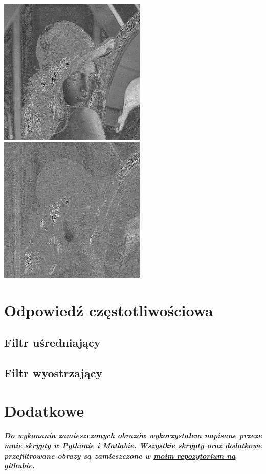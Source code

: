 \documentclass[a4paper,12pt,openany]{report}
\begin{document}
\begin{center}
\\
\\
\includegraphics[width=7cm]{resources/modified/lena/lena_sharpen_11x11.jpg}
\includegraphics[width=7cm]{resources/modified/lena/lena_sharpen_21x21.jpg}
\end{center}


\chapter{Odpowiedź częstotliwościowa}

\section{Filtr uśredniający}

\section{Filtr wyostrzający}



\chapter{Dodatkowe}
\paragraph{Do wykonania zamieszczonych obrazów wykorzystałem napisane przeze mnie skrypty w Pythonie i Matlabie. Wszystkie skrypty oraz dodatkowe przefiltrowane obrazy są zamieszczone w \href{https://github.com/FilipM13/CPS}{moim repozytorium na githubie}.}

 
\end{document}
